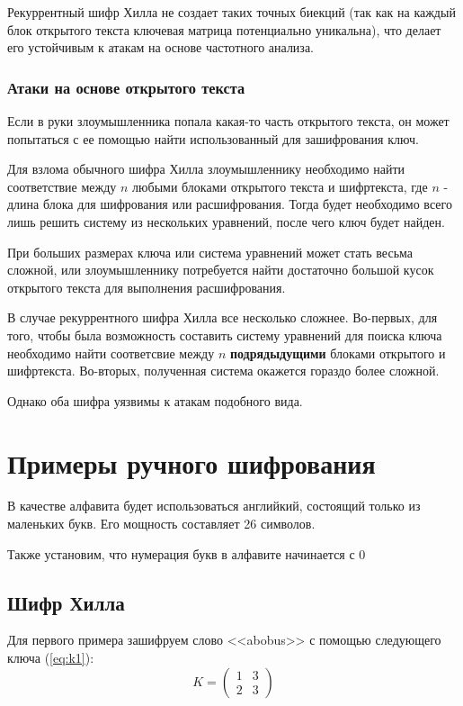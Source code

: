 \documentclass[a4paper]{article}
\begin{document}
  Рекуррентный шифр Хилла не создает таких точных биекций (так как на каждый блок открытого текста
  ключевая матрица потенциально уникальна), что делает его устойчивым к атакам на основе частотного анализа.

  \subsubsection{Атаки на основе открытого текста}

  Если в руки злоумышленника попала какая-то часть открытого текста, он может попытаться с ее
  помощью найти использованный для зашифрования ключ.

  Для взлома обычного шифра Хилла злоумышленнику необходимо найти соответствие между $n$ любыми блоками
  открытого текста и шифртекста, где $n$ - длина блока для шифрования или расшифрования. Тогда
  будет необходимо всего лишь решить систему из нескольких уравнений, после чего ключ будет найден.

  При больших размерах ключа или система уравнений может стать весьма сложной, или злоумышленнику потребуется найти
  достаточно большой кусок открытого текста для выполнения расшифрования.

  В случае рекуррентного шифра Хилла все несколько сложнее. Во-первых, для того, чтобы была возможность
  составить систему уравнений для поиска ключа необходимо найти соответсвие между $n$ \textbf{подрядыдущими}
  блоками открытого и шифртекста. Во-вторых, полученная система окажется гораздо более сложной.

  Однако оба шифра уязвимы к атакам подобного вида.

  \newpage
  \section{Примеры ручного шифрования}

  В качестве алфавита будет использоваться английкий, состоящий только из маленьких букв. Его мощность составляет 26 символов.

  Также установим, что нумерация букв в алфавите начинается с 0

  \subsection{Шифр Хилла}

  Для первого примера зашифруем слово <<abobus>> с помощью следующего ключа (\ref{eq:k1}):
  \begin{equation}
    K = \begin{pmatrix}
        1 & 3 \\ 2 & 3
    \end{pmatrix}
    \label{eq:k1}
  \end{equation}
\end{document}
